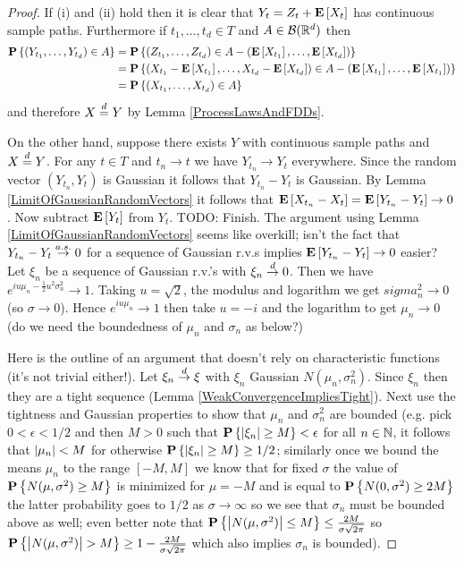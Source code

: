 \begin{proof}
If (i) and (ii) hold then it is clear that $Y_t = Z_t + \textbf{E}\left[X_t\right]$ has continuous sample paths.  Furthermore if $t_1, \dotsc, t_d \in T$ and $A \in \mathcal{B}(\mathbb{R}^d)$ then 
\begin{align*}
\textbf{P}\left \{(Y_{t_1}, \dotsc, Y_{t_d}) \in A \right \} &= \textbf{P}\left \{(Z_{t_1}, \dotsc, Z_{t_d}) \in A - (\textbf{E}\left[X_{t_1}\right], \dotsc, \textbf{E}\left[X_{t_d}\right]) \right \}  \\
&= \textbf{P}\left \{(X_{t_1} - \textbf{E}\left[X_{t_1}\right], \dotsc, X_{t_d} - \textbf{E}\left[X_{t_d}\right]) \in A - (\textbf{E}\left[X_{t_1}\right], \dotsc, \textbf{E}\left[X_{t_1}\right]) \right \}  \\
&=\textbf{P}\left \{(X_{t_1}, \dotsc, X_{t_d}) \in A \right \} 
\end{align*}
and therefore $X \overset{d}= Y$ by Lemma \ref{ProcessLawsAndFDDs}.

On the other hand, suppose there exists $Y$ with continuous sample paths and $X \overset{d}= Y$.  For any $t \in T$ and $t_n \to t$ we have $Y_{t_n} \to Y_t$ everywhere.  Since the random vector $(Y_{t_n}, Y_t)$ is Gaussian it follows that $Y_{t_n} - Y_t$ is Gaussian.  By Lemma \ref{LimitOfGaussianRandomVectors} it follows that $\textbf{E}\left[X_{t_n} - X_t\right]  = \textbf{E}\left[Y_{t_n} - Y_t\right]  \to 0$.  Now subtract $\textbf{E}\left[Y_t\right]$ from $Y_t$.
TODO: Finish.  The argument using Lemma \ref{LimitOfGaussianRandomVectors} seems like overkill; isn't the fact that $Y_{t_n} - Y_t \overset{a.s.}\to 0$ for a sequence of Gaussian r.v.s implies $\textbf{E}\left[Y_{t_n} - Y_t\right] \to 0$ easier?  Let $\xi_n$ be a sequence of Gaussian r.v.'s with $\xi_n \overset{d}\to 0$.  Then we have $e^{iu\mu_n - \frac{1}{2}u^2 \sigma_n^2} \to 1$.  Taking $u=\sqrt{2}$, the modulus and logarithm we get $sigma_n^2 \to 0$ (so $\sigma \to 0$).  Hence $e^{iu\mu_n} \to 1$ then take $u=-i$ and the logarithm to get $\mu_n \to 0$ (do we need the boundedness of $\mu_n$ and $\sigma_n$ as below?)

Here is the outline of an argument that doesn't rely on characteristic functions (it's not trivial either!).  Let $\xi_n \overset{d}\to \xi$ with $\xi_n$ Gaussian $N(\mu_n, \sigma_n^2)$.  Since $\xi_n$ then they are a tight sequence (Lemma \ref{WeakConvergenceImpliesTight}).  Next use the tightness and Gaussian properties to show that $\mu_n$ and $\sigma_n^2$ are bounded (e.g. pick $0 < \epsilon < 1/2$ and then $M>0$ such that $\textbf{P}\left \{\left \vert \xi_n \right \vert \geq M \right \} < \epsilon$ for all $n \in \mathbb{N}$, it follows that $\left \vert \mu_n \right \vert < M$ for otherwise $\textbf{P}\left \{\left \vert \xi_n \right \vert \geq M \right \} \geq 1/2$;  similarly once we bound the means $\mu_n$ to the range $[-M,M]$ we know that for fixed $\sigma$ the value of $\textbf{P}\left \{N(\mu, \sigma^2) \geq M \right \}$ is minimized for $\mu=-M$ and is equal to $\textbf{P}\left \{N(0, \sigma^2) \geq 2M \right \}$ the latter probability goes to $1/2$ as $\sigma \to \infty$ so we see that $\sigma_n$ must be bounded above as well; even better note that $\textbf{P}\left \{\left \vert N(\mu, \sigma^2)  \right \vert \leq M \right \} \leq \frac{2M}{\sigma \sqrt{2\pi}}$ so 
$\textbf{P}\left \{\left \vert N(\mu, \sigma^2)  \right \vert > M \right \} \geq 1 - \frac{2M}{\sigma \sqrt{2\pi}}$ which also implies $\sigma_n$ is bounded).


\end{proof}
